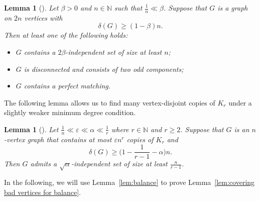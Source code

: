 \documentclass[11pt, a4paper]{article}
\newtheorem{lemma}[theorem]{Lemma}
\theoremstyle{definition}
\newcommand{\eps}{\varepsilon}
\newcommand{\<}{\subseteq}
\newcommand{\de}{\delta}
\begin{document}
\begin{lemma}[\cite{gan2024}]\label{thm:r-s=2}
Let $\beta>0$ and $n\in \mathbb{N}$ such that $\frac{1}{n}\ll\beta$. Suppose that $G$ is a graph on $2n$ vertices with $$\de(G)\ge (1-\beta)n.$$ Then at least one of the following holds:
\begin{itemize}
    \item $G$ contains a $2\beta$-independent set of size at least $n$;
    \item {$G$ is disconnected and consists of two odd components;}
    \item $G$ contains a perfect matching.
\end{itemize}
\end{lemma}
The following lemma allows us to find many vertex-disjoint copies of $K_r$ under a slightly weaker minimum degree condition. 
\begin{lemma}[\cite{Treg2015}]\label{SuperT}
    Let $\frac{1}{n} \ll \eps \ll \alpha \ll \frac{1}{r}$ where $r\in \mathbb{N}$ and $r\ge 2$. Suppose that $G$ is an $n$-vertex graph that contains at most $\eps n^r$ copies of $K_r$ and 
$$\delta(G)\ge \Big(1-\frac{1}{r-1}-\alpha\Big)n.$$
Then $G$ admits a $\sqrt{\alpha}$-independent set of size at least $\frac{n}{r-1}$.
\end{lemma}




In the following, we will use Lemma~\ref{lem:balance} to prove Lemma~\ref{lem:covering bad vertices for balance}. 
\end{document}
